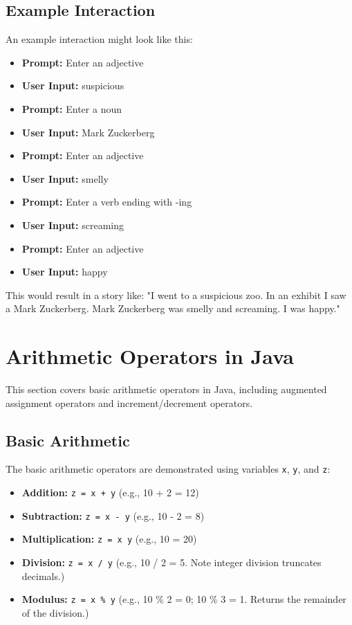 \documentclass{article}
\begin{document}
\subsection{Example Interaction}

An example interaction might look like this:

\begin{itemize}
    \item \textbf{Prompt:} Enter an adjective
    \item \textbf{User Input:} suspicious
    \item \textbf{Prompt:} Enter a noun
    \item \textbf{User Input:} Mark Zuckerberg
    \item \textbf{Prompt:} Enter an adjective
    \item \textbf{User Input:} smelly
    \item \textbf{Prompt:} Enter a verb ending with -ing
    \item \textbf{User Input:} screaming
    \item \textbf{Prompt:} Enter an adjective
    \item \textbf{User Input:} happy
\end{itemize}

This would result in a story like:  "I went to a suspicious zoo. In an exhibit I saw a Mark Zuckerberg. Mark Zuckerberg was smelly and screaming. I was happy."


\section{Arithmetic Operators in Java}

This section covers basic arithmetic operators in Java, including augmented assignment operators and increment/decrement operators.

\subsection{Basic Arithmetic}

The basic arithmetic operators are demonstrated using variables \texttt{x}, \texttt{y}, and \texttt{z}:

\begin{itemize}
    \item \textbf{Addition:} \texttt{z = x + y} (e.g., 10 + 2 = 12)
    \item \textbf{Subtraction:} \texttt{z = x - y} (e.g., 10 - 2 = 8)
    \item \textbf{Multiplication:} \texttt{z = x \* y} (e.g., 10  = 20)
    \item \textbf{Division:} \texttt{z = x / y} (e.g., 10 / 2 = 5. Note integer division truncates decimals.)
    \item \textbf{Modulus:} \texttt{z = x \% y} (e.g., 10 \% 2 = 0; 10 \% 3 = 1. Returns the remainder of the division.)
\end{itemize}
\end{document}
